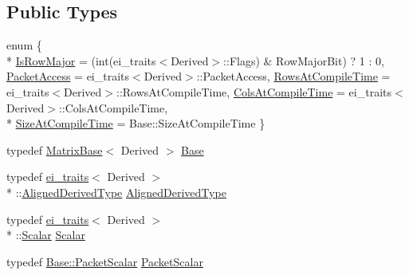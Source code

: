 \subsection*{Public Types}
\begin{DoxyCompactItemize}
\item 
enum \{ \\*
\hyperlink{class_map_base_ac719f876d6f36041268461062909ba94a74627dcbbfe36020ee8d5ab4e6d2d646}{Is\-Row\-Major} = (int(ei\-\_\-traits$<$Derived$>$\-:\-:Flags) \& Row\-Major\-Bit) ? 1 \-: 0, 
\hyperlink{class_map_base_ac719f876d6f36041268461062909ba94a710046df35a2f5f0a91697484b566345}{Packet\-Access} = ei\-\_\-traits$<$Derived$>$\-:\-:Packet\-Access, 
\hyperlink{class_map_base_ac719f876d6f36041268461062909ba94a4f9a290363768bcc82976c99dbcb7e46}{Rows\-At\-Compile\-Time} = ei\-\_\-traits$<$Derived$>$\-:\-:Rows\-At\-Compile\-Time, 
\hyperlink{class_map_base_ac719f876d6f36041268461062909ba94ad4c60fe2e96f171c54fee1204b86d2d3}{Cols\-At\-Compile\-Time} = ei\-\_\-traits$<$Derived$>$\-:\-:Cols\-At\-Compile\-Time, 
\\*
\hyperlink{class_map_base_ac719f876d6f36041268461062909ba94a671bf6e464e6c7aa0656143c4f6c18fc}{Size\-At\-Compile\-Time} = Base\-:\-:Size\-At\-Compile\-Time
 \}
\item 
typedef \hyperlink{class_matrix_base}{Matrix\-Base}$<$ Derived $>$ \hyperlink{class_map_base_a4e995268eb1db197239d284e956241f9}{Base}
\item 
typedef \hyperlink{structei__traits}{ei\-\_\-traits}$<$ Derived $>$\\*
\-::\hyperlink{class_map_base_a57c5a3543f137919cfd9aba5aa05005a}{Aligned\-Derived\-Type} \hyperlink{class_map_base_a57c5a3543f137919cfd9aba5aa05005a}{Aligned\-Derived\-Type}
\item 
typedef \hyperlink{structei__traits}{ei\-\_\-traits}$<$ Derived $>$\\*
\-::\hyperlink{class_map_base_abda8b790105e1c385696bfa2fe7b9c12}{Scalar} \hyperlink{class_map_base_abda8b790105e1c385696bfa2fe7b9c12}{Scalar}
\item 
typedef \hyperlink{class_matrix_base_a58f32cd6a06433ee7a60efa03e99183a}{Base\-::\-Packet\-Scalar} \hyperlink{class_map_base_a077d2371608a126a9396c7de40002bad}{Packet\-Scalar}
\end{DoxyCompactItemize}
